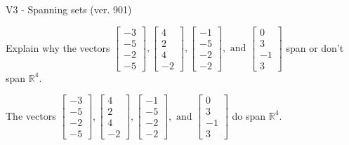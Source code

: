 \begin{exercise}
  \begin{exerciseTitle}V3 - Spanning sets (ver. 901)\end{exerciseTitle}
  \begin{exerciseStatement}
    Explain why the vectors \(\left[\begin{array}{r}
-3 \\
-5 \\
-2 \\
-5
\end{array}\right] , \left[\begin{array}{r}
4 \\
2 \\
4 \\
-2
\end{array}\right] , \left[\begin{array}{r}
-1 \\
-5 \\
-2 \\
-2
\end{array}\right] , \text{ and } \left[\begin{array}{r}
0 \\
3 \\
-1 \\
3
\end{array}\right]\) span or don't span \(\mathbb{R}^4\). 
	


  \end{exerciseStatement}
  \begin{exerciseAnswer}
   The vectors \(\left[\begin{array}{r}
-3 \\
-5 \\
-2 \\
-5
\end{array}\right] , \left[\begin{array}{r}
4 \\
2 \\
4 \\
-2
\end{array}\right] , \left[\begin{array}{r}
-1 \\
-5 \\
-2 \\
-2
\end{array}\right] , \text{ and } \left[\begin{array}{r}
0 \\
3 \\
-1 \\
3
\end{array}\right]\) 
  	 do  
	span \(\mathbb{R}^4\).
  


  \end{exerciseAnswer}
\end{exercise}